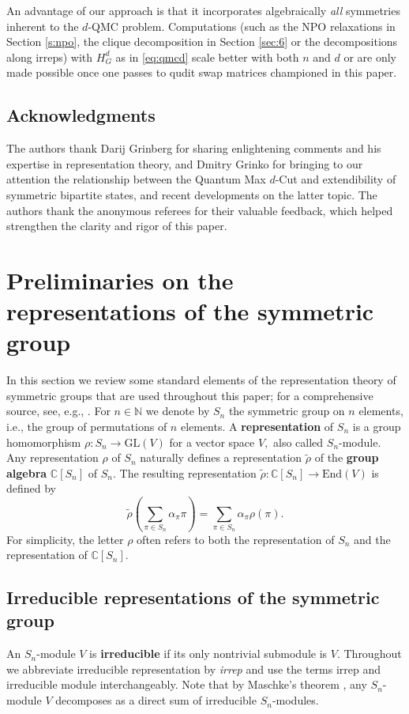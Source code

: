\documentclass[12pt,dvipsnames,accepted=2016-08-18,a4paper,onecolumn]{quantumarticle}
\numberwithin{equation}{section}
\newcommand{\NN}{\mathbb N}
\newcommand{\CC}{\mathbb C}
\theoremstyle{definition}
\begin{document}
An advantage of our approach is that it incorporates algebraically \emph{all} symmetries inherent to the $d$-QMC problem.
Computations (such as the NPO relaxations in Section \ref{s:npo}, the clique decomposition in Section \ref{sec:6} or the decompositions along irreps) with $H_G^d$ as in \eqref{eq:qmcd} scale better with both $n$ and $d$ or are only made possible once one passes to qudit swap matrices championed in this paper.

\subsection*{Acknowledgments}
The authors thank 
Darij Grinberg for sharing enlightening comments and his expertise in representation theory, and
Dmitry Grinko for bringing to our attention the relationship between the Quantum Max $d$-Cut and extendibility of symmetric bipartite states, and recent developments on the latter topic.
{The authors thank the anonymous referees for their valuable feedback, which helped strengthen the clarity and rigor of this paper.}

 \section{Preliminaries on the representations of the symmetric group}

In this section we review some standard elements of the representation theory of symmetric groups that are used throughout this paper; for a comprehensive source, see, e.g., \cite{FH,Probook}.
For $n \in \NN$ we denote by $S_n$ the symmetric group on $n$ elements, i.e., the group of permutations of $n$ elements. A \textbf{representation} of $S_n$ is a group homomorphism $\rho : S_n \to \text{GL}(V)$ for a vector space $V,$ also called $S_n$-module.  Any representation $\rho$ of $S_n$ naturally defines a representation $\tilde{\rho}$ of the \textbf{group algebra} $\CC [S_n]$ of $S_n.$ The resulting representation $\tilde{\rho} : \CC [S_n] \to \text{End}(V)$ is defined by
 $$
 \tilde{\rho}\left(\sum_{\pi\in S_n} \alpha_\pi \pi  \right) = \sum_{\pi\in S_n} \alpha_\pi \rho(\pi).
 $$
 For simplicity, the letter $\rho$ often refers to both the representation of $S_n$ and the representation of $\CC[S_n].$ 

\subsection{Irreducible representations of the symmetric group}
 An $S_n$-module $V$ is \textbf{irreducible} if its only nontrivial submodule is $V.$ Throughout we abbreviate irreducible representation by \textit{irrep} and use the terms irrep and irreducible module interchangeably.  Note that by Maschke's theorem \cite[Section 6.1.5]{Probook}, any $S_n$-module $V$ decomposes as a direct sum of irreducible $S_n$-modules.
\end{document}
